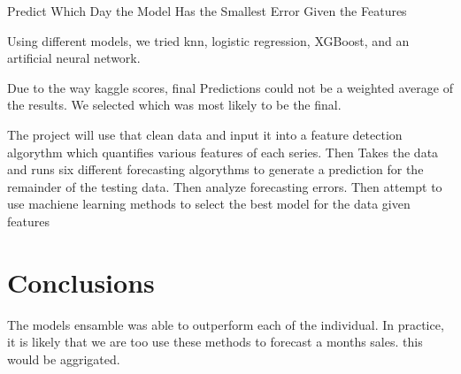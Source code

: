 \documentclass[16pt,twocolumn,letterpaper]{article}
\begin{document}
Predict Which Day the Model Has the Smallest Error Given the Features

Using different models, we tried knn, logistic regression, XGBoost, and an artificial neural network. 

Due to the way kaggle scores, final Predictions could not be a weighted average of the results. We selected which was most likely to be the final.

The project will use that clean data and input it into a feature detection algorythm which quantifies various features of each series. Then Takes the data and runs six different forecasting algorythms to generate a prediction for the remainder of the testing data. Then analyze forecasting errors. Then attempt to use machiene learning methods to select the best model for the data given features


\section{Conclusions}

The models ensamble was able to outperform each of the individual. In practice, it is likely that we are too use these methods to forecast a months sales. this would be aggrigated.

\clearpage
\onecolumn


\end{document}
